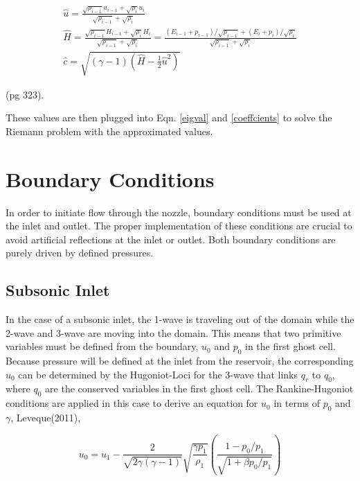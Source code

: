 \documentclass{article}%
\numberwithin{equation}{section}
\begin{document}
\begin{equation}
\begin{split}
\hat{u}= \frac{\sqrt{\rho_{i - 1}} u_{i-1} + \sqrt{\rho_i} u_i}{\sqrt{\rho_{i-1}} + \sqrt{\rho_i}}  \\
\hat{H} = \frac{\sqrt{\rho_{i - 1}} H_{i-1} + \sqrt{\rho_i} H_i}{\sqrt{\rho_{i-1}} + \sqrt{\rho_i}} = \frac{(E_{i-1} + p_{i-1})/\sqrt{\rho_{i - 1}}+ (E_i + p_i) / \sqrt{\rho_i} }{\sqrt{\rho_{i-1}} + \sqrt{\rho_i}} \\
\hat{c} = \sqrt{(\gamma - 1) \left( \hat{H} - \frac{1}{2} \hat{u}^2 \right)}
\end{split}
\end{equation}

(pg 323).

These values are then plugged into Eqn. \ref{eigval} and \ref{coeffcients} to solve the Riemann problem with the approximated values.

\section{Boundary Conditions}
In order to initiate flow through the nozzle, boundary conditions must be used at the inlet and outlet. The proper implementation of these conditions are crucial to avoid artificial reflections at the inlet or outlet. Both boundary conditions are purely driven by defined pressures.

\subsection{Subsonic Inlet}
In the case of a subsonic inlet, the 1-wave is traveling out of the domain while the 2-wave and 3-wave are moving into the domain. This means that two primitive variables must be defined from the boundary, $u_0$ and $p_0$ in the first ghost cell. Because pressure will be defined at the inlet from the reservoir, the corresponding $u_0$ can be determined by the Hugoniot-Loci for the 3-wave that links $q_r$ to $q_0$, where $q_0$ are the conserved variables in the first ghost cell. The Rankine-Hugoniot conditions are applied in this case to derive an equation for $u_0$ in terms of $p_0$ and $\gamma$, Leveque(2011),

\begin{equation}
u_0 = u_1 - \frac{2}{\sqrt{2 \gamma (\gamma - 1)}} \sqrt{\frac{\gamma p_1}{\rho_1}} \left( \frac{1 - p_0 / p_1}{\sqrt{1 + \beta p_0 / p_1}} \right)
\end{equation}
\end{document}
